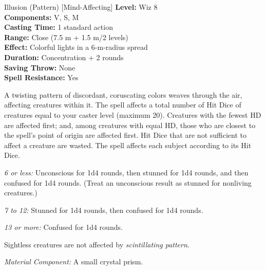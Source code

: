 {Illusion (Pattern) [Mind-Affecting]}
{
	\textbf{Level:}
	Wiz 8\\
	\textbf{Components:}
	V, S, M\\
	\textbf{Casting Time:}
	1 standard action\\
	\textbf{Range:}
	Close (7.5 m + 1.5 m/2 levels)\\
	\textbf{Effect:}
	Colorful lights in a 6-m-radius spread\\
	\textbf{Duration:}
	Concentration + 2 rounds\\
	\textbf{Saving Throw:}
	None\\
	\textbf{Spell Resistance:}
	Yes\\
}
{
	A twisting pattern of discordant, coruscating colors weaves through the air, affecting creatures within it. The spell affects a total number of Hit Dice of creatures equal to your caster level (maximum 20). Creatures with the fewest HD are affected first; and, among creatures with equal HD, those who are closest to the spell's point of origin are affected first. Hit Dice that are not sufficient to affect a creature are wasted. The spell affects each subject according to its Hit Dice.

	\textit{6 or less:}
Unconscious for 1d4 rounds, then stunned for 1d4 rounds, and then confused for 1d4 rounds. (Treat an unconscious result as stunned for nonliving creatures.)

	\textit{7 to 12:}
	Stunned for 1d4 rounds, then confused for 1d4 rounds.

	\textit{13 or more:}
	Confused for 1d4 rounds.

	Sightless creatures are not affected by \emph{scintillating pattern}.

	\textit{Material Component:}
	A small crystal prism.

}
